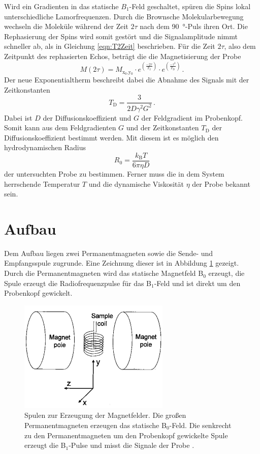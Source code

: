 Wird ein Gradienten in das statische $B_1$-Feld geschaltet, spüren die Spins lokal unterschiedliche Lamorfrequenzen.
Durch die Brownsche Molekularbewegung wechseln die Moleküle während der Zeit $2\tau$ nach dem \SI{90}{\degree}-Puls ihren Ort.
Die Rephasierung der Spins wird somit gestört und die Signalamplitude nimmt schneller ab, als in Gleichung \eqref{eqn:T2Zeit} beschrieben.
Für die Zeit $2\tau$, also dem Zeitpunkt des rephasierten Echos, beträgt die die Magnetisierung der Probe
\begin{equation}
  M(2\tau) = M_\text{x$_0$,y$_0$} \cdot e^{(\frac{-2\tau}{T_2})} \cdot e^{(\frac{-\tau^3}{T_\text{D}})} \, .
  \label{eqn:Diffusion}
\end{equation}
Der neue Exponentialtherm beschreibt dabei die Abnahme des Signals mit der Zeitkonstanten
\begin{equation}
  T_\text{D} = \frac{3}{2D \gamma^2 G^2}\,.
  \label{eqn:TDiffusion}
\end{equation}
Dabei ist $D$ der Diffusionskoeffizient und $G$ der Feldgradient im Probenkopf.
Somit kann aus dem Feldgradienten $G$ und der Zeitkonstanten $T_\text{D}$ der Diffusionskoeffizient bestimmt werden.
Mit diesem ist es möglich den hydrodynamischen Radius
\begin{equation}
  R_0 = \frac{k_\text{B} T}{6 \pi \eta D}
  \label{eqn:stokes}
\end{equation}
 der untersuchten Probe zu bestimmen.
 Ferner muss die in dem System herrschende Temperatur $T$ und die dynamische Viskosität $\eta$ der Probe bekannt sein.


\section{Aufbau}
Dem Aufbau liegen zwei Permanentmagneten sowie die Sende- und Empfangsspule zugrunde.
Eine Zeichnung dieser ist in Abbildung \ref{fig:NMR-Magneten} gezeigt.
Durch die Permanentmagneten wird das statische Magnetfeld B$_0$ erzeugt, die Spule erzeugt die Radiofrequenzpulse für das B$_1$-Feld und ist direkt um den Probenkopf gewickelt.

\begin{figure}[H]
  \centering
  \includegraphics[width = .4\textwidth]{NMR-Magnete.png}
  \caption{Spulen zur Erzeugung der Magnetfelder. Die großen Permanentmagneten erzeugen das statische B$_0$-Feld. Die senkrecht zu den Permanentmagneten um den Probenkopf gewickelte Spule erzeugt die B$_1$-Pulse und misst die Signale der Probe \cite{Aachen}. }
  \label{fig:NMR-Magneten}
\end{figure}

